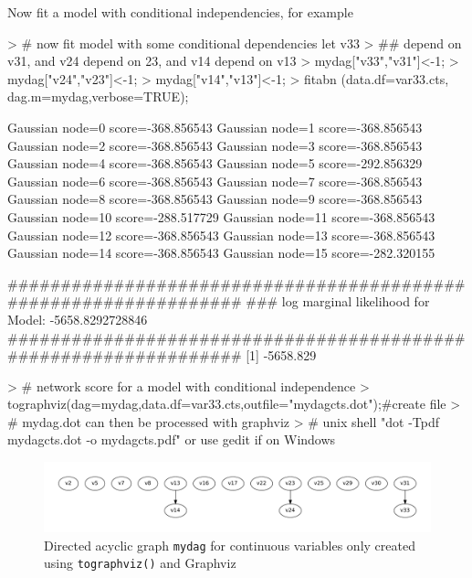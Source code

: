 \documentclass[nojss]{jss}
\begin{document}
Now fit a model with conditional independencies, for example 
\begin{Schunk}
\begin{Sinput}
> # now fit model with some conditional dependencies let v33 
> ## depend on v31, and v24 depend on 23, and v14 depend on v13
> mydag["v33","v31"]<-1;
> mydag["v24","v23"]<-1;
> mydag["v14","v13"]<-1;
> fitabn (data.df=var33.cts, dag.m=mydag,verbose=TRUE);
\end{Sinput}
\begin{Soutput}
Gaussian node=0 score=-368.856543
Gaussian node=1 score=-368.856543
Gaussian node=2 score=-368.856543
Gaussian node=3 score=-368.856543
Gaussian node=4 score=-368.856543
Gaussian node=5 score=-292.856329
Gaussian node=6 score=-368.856543
Gaussian node=7 score=-368.856543
Gaussian node=8 score=-368.856543
Gaussian node=9 score=-368.856543
Gaussian node=10 score=-288.517729
Gaussian node=11 score=-368.856543
Gaussian node=12 score=-368.856543
Gaussian node=13 score=-368.856543
Gaussian node=14 score=-368.856543
Gaussian node=15 score=-282.320155

   #################################################################
   ###      log marginal likelihood for Model: -5658.8292728846
   #################################################################
[1] -5658.829
\end{Soutput}
\begin{Sinput}
> # network score for a model with conditional independence
> tographviz(dag=mydag,data.df=var33.cts,outfile="mydagcts.dot");#create file
> # mydag.dot can then be processed with graphviz
> # unix shell "dot -Tpdf mydagcts.dot -o mydagcts.pdf" or use gedit if on Windows
\end{Sinput}
\end{Schunk}
\begin{figure}[htb]
\includegraphics{mydagcts}
\vspace{-1.0cm}
\caption{Directed acyclic graph {\tt mydag} for continuous variables only created using {\tt tographviz()} and Graphviz} \label{fig3}
\end{figure}
\end{document}

